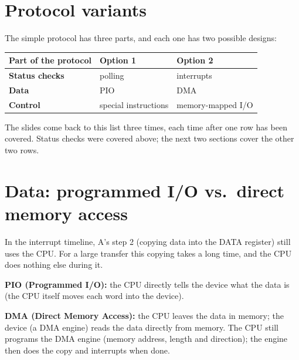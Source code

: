 \documentclass[11pt,a4paper]{article}
\begin{document}
\section{Protocol variants}

The simple protocol has three parts, and each one has two possible designs:

\begin{center}
\renewcommand{\arraystretch}{1.25}
\begin{tabular}{@{}lll@{}}
  \toprule
  \textbf{Part of the protocol} & \textbf{Option 1} & \textbf{Option 2} \\
  \midrule
  \textbf{Status checks} & polling & interrupts \\
  \textbf{Data} & PIO & DMA \\
  \textbf{Control} & special instructions & memory-mapped I/O \\
  \bottomrule
\end{tabular}
\end{center}

The slides come back to this list three times, each time after one row has
been covered. Status checks were covered above; the next two sections
cover the other two rows.

\section{Data: programmed I/O vs.\ direct memory access}

\begin{quizbox}
In the interrupt timeline, A's step 2 (copying data into the DATA register)
still uses the CPU. For a large transfer this copying takes a long time,
and the CPU does nothing else during it.
\end{quizbox}

\begin{defbox}
\textbf{PIO (Programmed I/O):} the CPU directly tells the device what the
data is (the CPU itself moves each word into the device).

\textbf{DMA (Direct Memory Access):} the CPU leaves the data in memory; the
device (a DMA engine) reads the data directly from memory. The CPU still
programs the DMA engine (memory address, length and direction); the engine
then does the copy and interrupts when done.
\end{defbox}
\end{document}

